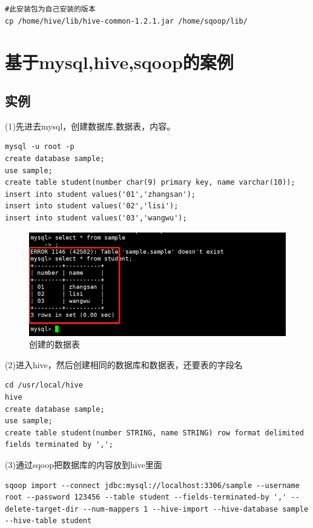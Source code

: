 \documentclass[12pt]{article}
\begin{document}
\begin{lstlisting}[language={[ANSI]C}]
#此安装包为自己安装的版本
cp /home/hive/lib/hive-common-1.2.1.jar /home/sqoop/lib/
\end{lstlisting}


\section{基于mysql,hive,sqoop的案例}

\subsection{实例}
(1)先进去mysql，创建数据库,数据表，内容。

\begin{lstlisting}[language={[ANSI]C}]
mysql -u root -p
create database sample;
use sample;
create table student(number char(9) primary key, name varchar(10));
insert into student values('01','zhangsan');
insert into student values('02','lisi');
insert into student values('03','wangwu');
\end{lstlisting}

\begin{figure}[ht]
\centering
\includegraphics[scale=1.0]{figures/25.png}
\caption{创建的数据表}\label{fig:label2}
\end{figure}

\newpage
(2)进入hive，然后创建相同的数据库和数据表，还要表的字段名
\begin{lstlisting}[language={[ANSI]C}]
cd /usr/local/hive
hive
create database sample;
use sample;
create table student(number STRING, name STRING) row format delimited fields terminated by ',';
\end{lstlisting}

(3)通过sqoop把数据库的内容放到hive里面

\begin{lstlisting}
sqoop import --connect jdbc:mysql://localhost:3306/sample --username root --password 123456 --table student --fields-terminated-by ',' --delete-target-dir --num-mappers 1 --hive-import --hive-database sample --hive-table student
\end{lstlisting}
\end{document}
